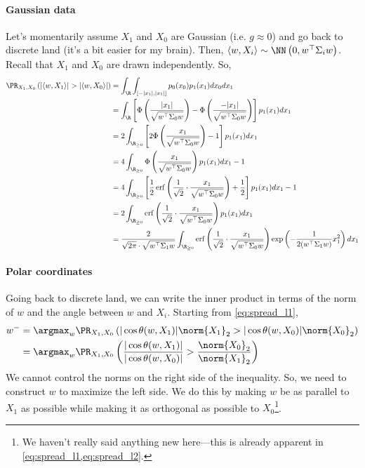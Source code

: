 \documentclass{article}
\begin{document}
\paragraph*{Gaussian data}
Let's momentarily assume $X_1$ and $X_0$ are Gaussian (i.e. $g \approx 0$) and go back to discrete land (it's a bit easier for my brain).
Then, $\langle w, X_i \rangle \sim \NN\left( 0, w^\top \Sigma_i w \right)$.
Recall that $X_1$ and $X_0$ are drawn independently.
So,
\begin{align*}
  \PR_{X_1, X_0} \left( |\langle w, X_1 \rangle| > |\langle w, X_0 \rangle| \right)
  &= \int_{\R} \int_{[-|x_1|,|x_1|]} p_0(x_0) p_1(x_1) dx_0 dx_1 \\
  &= \int_{\R} \left[ \Phi\left( \frac{|x_1|}{\sqrt{w^\top \Sigma_0 w}} \right) - \Phi\left( \frac{-|x_1|}{\sqrt{w^\top \Sigma_0 w}} \right) \right] p_1(x_1) dx_1 \\
  &= 2 \int_{\R_{\geq 0}} \left[ 2 \Phi\left( \frac{x_1}{\sqrt{w^\top \Sigma_0 w}} \right) - 1 \right] p_1(x_1) dx_1 \\
  &= 4 \int_{\R_{\geq 0}} \Phi\left( \frac{x_1}{\sqrt{w^\top \Sigma_0 w}} \right) p_1(x_1) dx_1 - 1 \\
  &= 4 \int_{\R_{\geq 0}} \left[ \frac{1}{2} \operatorname{erf}\left( \frac{1}{\sqrt{2}} \cdot \frac{x_1}{\sqrt{w^\top \Sigma_0 w}} \right) + \frac{1}{2} \right] p_1(x_1) dx_1 - 1 \\
  &= 2 \int_{\R_{\geq 0}} \operatorname{erf}\left( \frac{1}{\sqrt{2}} \cdot \frac{x_1}{\sqrt{w^\top \Sigma_0 w}} \right) p_1(x_1) dx_1 \\
  &= \frac{ 2 }{ \sqrt{2\pi} \cdot \sqrt{w^\top \Sigma_1 w} } \int_{\R_{\geq 0}} \operatorname{erf}\left( \frac{1}{\sqrt{2}} \cdot \frac{x_1}{\sqrt{w^\top \Sigma_0 w}} \right) \exp\left( - \frac{1}{2 (w^\top \Sigma_1 w)} x_1^2 \right) dx_1
\end{align*}


\paragraph*{Polar coordinates}
Going back to discrete land, we can write the inner product in terms of the norm of $w$ and the angle between $w$ and $X_i$.
Starting from \cref{eq:spread_l1},
\begin{align}
  w^-
  &= \argmax_{w} \PR_{X_1, X_0} \left( |\cos \theta(w,X_1) | \norm{X_1}_{2} > | \cos \theta(w,X_0) | \norm{X_0}_{2} \right) \\
  &= \argmax_{w} \PR_{X_1, X_0} \left( \frac{ |\cos \theta(w,X_1) | }{ | \cos \theta(w,X_0) | } > \frac{ \norm{X_0}_{2} }{ \norm{X_1}_{2} } \right)
\end{align}
We cannot control the norms on the right side of the inequality.
So, we need to construct $w$ to maximize the left side.
We do this by making $w$ be as parallel to $X_1$ as possible while making it as orthogonal as possible to $X_0$\footnote{We haven't really said anything new here—this is already apparent in \cref{eq:spread_l1,eq:spread_l2}.}.
\end{document}
